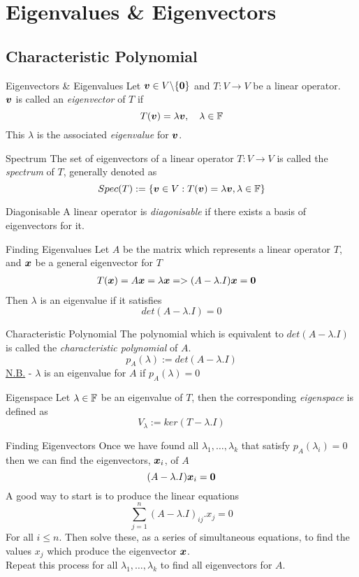 \documentclass[11pt,a4paper]{article}
\begin{document}
\section{Eigenvalues \& Eigenvectors}

\subsection{Characteristic Polynomial}

\subtitle{Definition 8.01 - }{Eigenvectors \& Eigenvalues}
Let $\boldsymbol{v} \in V\backslash\{\boldsymbol{0}\}$ and $T : V \to V$ be a linear operator.\\
$\boldsymbol{v}$ is called an \textit{eigenvector} of $T$ if $$T(\boldsymbol{v}) = \lambda\boldsymbol{v}, \quad \lambda \in \mathbb{F}$$
This $\lambda$ is the associated \textit{eigenvalue} for $\boldsymbol{v}$.\\

\subtitle{Definition 8.02 - }{Spectrum}
The set of eigenvectors of a linear operator $T : V \to V$ is called the \textit{spectrum} of $T$, generally denoted as $$Spec(T) := \{\boldsymbol{v} \in V : T(\boldsymbol{v}) = \lambda\boldsymbol{v}, \lambda \in \mathbb{F}\}$$

\subtitle{Defintion 8.03 - }{Diagonisable}
A linear operator is \textit{diagonisable} if there exists a basis of eigenvectors for it.\\

\subtitle{Remark 8.04 - }{Finding Eigenvalues}
Let $A$ be the matrix which represents a linear operator $T$, and $\boldsymbol{x}$ be a general eigenvector for $T$
\begin{alignat*}{1}
  T(\boldsymbol{x}) = A\boldsymbol{x} &= \lambda\boldsymbol{x}
  => (A - \lambda.I)\boldsymbol{x} = \boldsymbol{0}
\end{alignat*}
Then $\lambda$ is an eigenvalue if it satisfies $$det(A - \lambda.I) = 0$$

\subtitle{Definition 8.05 - }{Characteristic Polynomial}
The polynomial which is equivalent to $det(A - \lambda.I)$ is called the \textit{characteristic polynomial} of $A$.
$$p_A(\lambda) := det(A - \lambda.I)$$
\underline{N.B.} - $\lambda$ is an eigenvalue for $A$ if $p_A(\lambda) = 0$\\

\subtitle{Definition 8.06 - }{Eigenspace}
Let $\lambda \in \mathbb{F}$ be an eigenvalue of $T$, then the corresponding \textit{eigenspace} is defined as
$$V_\lambda := ker(T - \lambda.I)$$

\subtitle{Remark 8.07 - }{Finding Eigenvectors}
Once we have found all $\lambda_1 , \dots , \lambda_k$ that satisfy $p_A(\lambda_i) = 0$ then we can find the eigenvectors, $\boldsymbol{x}_i$, of $A$
$$(A - \lambda.I)\boldsymbol{x}_i = \boldsymbol{0}$$
A good way to start is to produce the linear equations
$$\sum_{j=1}^{n} (A - \lambda.I)_{ij}.x_j = 0$$
For all $i \leq n$. Then solve these, as a series of simultaneous equations, to find the values $x_j$ which produce the eigenvector $\boldsymbol{x}$.\\
Repeat this process for all $\lambda_1 , \dots , \lambda_k$ to find all eigenvectors for $A$.\\
\end{document}
